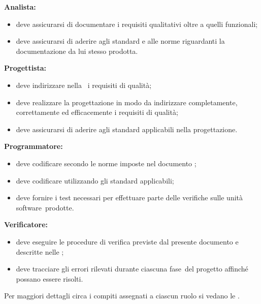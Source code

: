 \documentclass[../PianoDiQualifica.tex]{subfiles}
\begin{document}
			\textbf{Analista:}
			\begin{itemize}
				\item deve assicurarsi di documentare i requisiti qualitativi oltre a quelli funzionali;
				\item deve assicurarsi di aderire agli standard e alle norme riguardanti la documentazione da lui stesso prodotta.
			\end{itemize}
			\textbf{Progettista:}
			\begin{itemize}
				\item deve indirizzare nella \specificatecnica\ i requisiti di qualità;
				\item deve realizzare la progettazione in modo da indirizzare completamente, correttamente ed efficacemente i requisiti di qualità;
				\item deve assicurarsi di aderire agli standard applicabili nella progettazione.
			\end{itemize}
			\textbf{Programmatore:}
			\begin{itemize}
				\item deve codificare secondo le norme imposte nel documento \normediprogettov;
				\item deve codificare utilizzando gli standard applicabili;
				\item deve fornire i test necessari per effettuare parte delle verifiche sulle unità software\g\ prodotte.
			\end{itemize}
			\textbf{Verificatore:}
			\begin{itemize}
				\item deve eseguire le procedure di verifica previste dal presente documento e descritte nelle \normediprogettov;
				\item deve tracciare gli errori rilevati durante ciascuna fase\g\ del progetto affinché possano essere risolti.
			\end{itemize}
		Per maggiori dettagli circa i compiti assegnati a ciascun ruolo si vedano le \normediprogettov.
\end{document}
